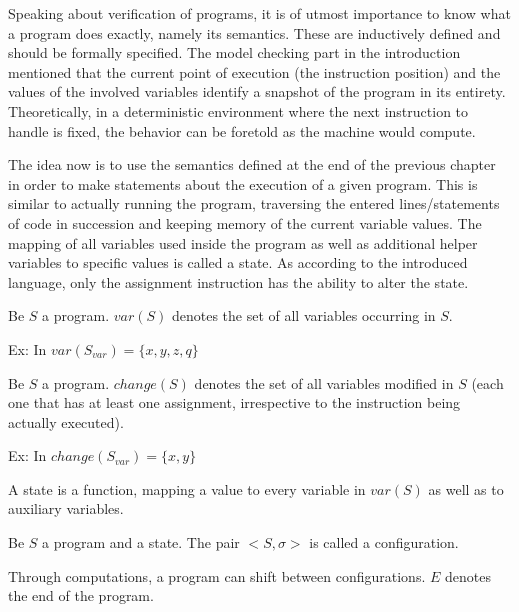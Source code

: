 Speaking about verification of programs, it is of utmost importance to know what a program does exactly, namely its semantics. These are inductively defined and should be formally specified. The model checking part in the introduction mentioned that the current point of execution (the instruction position) and the values of the involved variables identify a snapshot of the program in its entirety. Theoretically, in a deterministic environment where the next instruction to handle is fixed, the behavior can be foretold as the machine would compute.

The idea now is to use the semantics defined at the end of the previous chapter in order to make statements about the execution of a given program. This is similar to actually running the program, traversing the entered lines/statements of code in succession and keeping memory of the current variable values. The mapping of all variables used inside the program as well as additional helper variables to specific values is called a state. As according to the introduced language, only the assignment instruction has the ability to alter the state.

\begin{definition}
	Be $S$ a program. $var(S)$ denotes the set of all variables occurring in $S$.
\end{definition}

Ex: In  $var(S_{var})=\{x, y, z, q\}$


\begin{definition}
	Be $S$ a program. $change(S)$ denotes the set of all variables modified in $S$ (each one that has at least one assignment, irrespective to the instruction being actually executed).
\end{definition}

Ex: In  $change(S_{var})=\{x, y\}$

\begin{definition}
	A state is a function, mapping a value to every variable in $var(S)$ as well as to auxiliary variables.
\end{definition}

\begin{definition}
	Be $S$ a program and \textsigma{} a state. The pair $<S,\sigma{}>$ is called a configuration.
\end{definition}

Through computations, a program can shift between configurations. $E$ denotes the end of the program.

